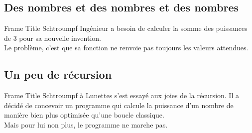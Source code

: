 \documentclass[aspectratio=169]{beamer}
\begin{document}
\subsection{Des nombres et des nombres et des nombres}

\begin{frame}{Frame Title}
    Schtroumpf Ingénieur a besoin de calculer la somme des puissances de 3 pour
    sa nouvelle invention.\\
    \pause
    Le problème, c'est que sa fonction ne renvoie pas toujours les valeurs
    attendues.
\end{frame}

\subsection{Un peu de récursion}

\begin{frame}{Frame Title}
    Schtroumpf à Lunettes s'est essayé aux joies de la récursion. Il a décidé de
    concevoir un programme qui calcule la puissance d'un nombre de manière bien
    plus optimisée qu'une boucle classique.\\
    \pause
    Mais pour lui non plus, le programme ne marche pas.
\end{frame}
\end{document}
